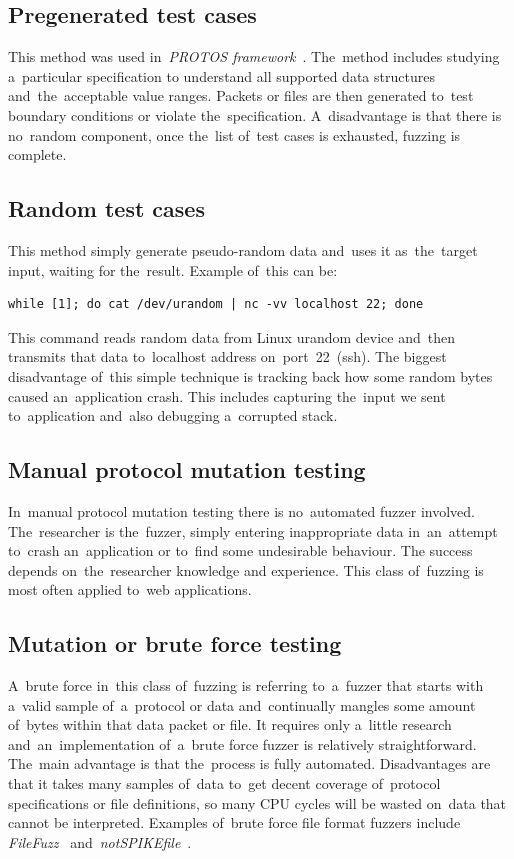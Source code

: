 \subsection{Pregenerated test cases}
This method was used in~\emph{PROTOS framework}~\cite{PROTOS}. The~method
includes studying a~particular specification to understand all supported data
structures and~the~acceptable value ranges. Packets or files are then generated
to~test boundary conditions or violate the~specification. A~disadvantage is that
there is no~random component, once the~list of~test cases is exhausted, fuzzing
is complete.

\subsection{Random test cases}
This method simply generate pseudo-random data and~uses it as~the~target input,
waiting for the~result. Example of~this can be:
\begin{lstlisting}[frame=single]
while [1]; do cat /dev/urandom | nc -vv localhost 22; done
\end{lstlisting}
This command reads random data from Linux urandom device and~then transmits
that data to~localhost address on~port~22~(ssh). The biggest disadvantage
of~this simple technique is tracking back how some random bytes caused
an~application crash. This includes capturing the~input we sent to~application
and~also debugging a~corrupted stack.

\subsection{Manual protocol mutation testing}
In~manual protocol mutation testing there is no~automated fuzzer involved.
The~researcher is the~fuzzer, simply entering inappropriate data in~an~attempt
to~crash an~application or to~find some undesirable behaviour. The success
depends on~the~researcher knowledge and experience. This class of~fuzzing is
most often applied to~web applications.

\subsection{Mutation or brute force testing}
A~brute force in~this class of~fuzzing is referring to~a~fuzzer that starts with
a~valid sample of~a~protocol or data and~continually mangles some amount
of~bytes within that data packet or file. It requires only a~little research
and~an~implementation of~a~brute force fuzzer is relatively straightforward.
The~main advantage is that the~process is fully automated. Disadvantages
are that it takes many samples of~data to~get decent coverage of~protocol
specifications or file definitions, so many CPU cycles will be wasted on~data
that cannot be interpreted. Examples of~brute force file format fuzzers include
\emph{FileFuzz}~\cite{FileFuzz} and~\emph{notSPIKEfile}~\cite{fuzzing.org}.


